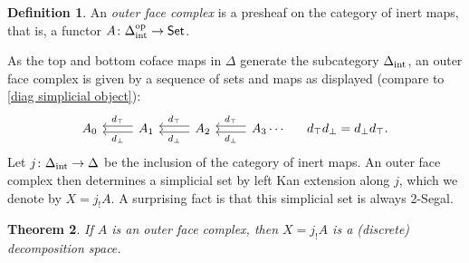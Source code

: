 \documentclass{amsart}
\newtheorem{theorem}{Theorem}[section]
\theoremstyle{definition}
\newtheorem{definition}[theorem]{Definition}
\theoremstyle{remark}
\newcommand{\set}{\mathsf{Set}}
\newcommand{\op}{\textup{op}}
\newcommand{\intrm}{\textup{int}}
\newcommand{\delint}{\Delta_\intrm}
\begin{document}
\begin{definition}
An \emph{outer face complex} is a presheaf on the category of inert maps, that is, a functor $A \colon \delint^\op \to \set$.
\end{definition}

As the top and bottom coface maps in $\Delta$ generate the subcategory $\delint$, an outer face complex is given by a sequence of sets and maps as displayed (compare to \eqref{diag simplicial object}):
\begin{equation}%
\begin{tikzcd}
A_0 & A_1 \lar[shift left, "d_\bot"] \lar[shift right, "d_\top"']  & A_2 \lar[shift left, "d_\bot"] \lar[shift right, "d_\top"']
 &
A_3 
\lar[shift left, "d_\bot"] \lar[shift right, "d_\top"'] \cdots &[-0.5cm] d_\top d_\bot = d_\bot d_\top.
\end{tikzcd} \end{equation}
Let $j\colon \delint \to \Delta$ be the inclusion of the category of inert maps.
An outer face complex then determines a simplicial set by left Kan extension along $j$, which we denote by $X = j_! A$.
A surprising fact is that this simplicial set is always 2-Segal.

\begin{theorem}
If $A$ is an outer face complex, then $X = j_! A$ is a (discrete) decomposition space.
\end{theorem}
\end{document}
